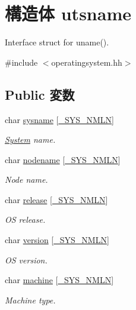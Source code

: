 \hypertarget{structOperatingSystem_1_1utsname}{
\section{構造体 utsname}
\label{structOperatingSystem_1_1utsname}
}


Interface struct for uname().  


{\ttfamily \#include $<$operatingsystem.hh$>$}\subsection*{Public 変数}
\begin{DoxyCompactItemize}
\item 
char \hyperlink{structOperatingSystem_1_1utsname_a2deb62088193f0a1a1c7169961ef9417}{sysname} \mbox{[}\hyperlink{classOperatingSystem_a1a19d4c9718c9a4ad5fa2e48271fccc9}{\_\-SYS\_\-NMLN}\mbox{]}
\begin{DoxyCompactList}\small\item\em \hyperlink{classSystem}{System} name. \item\end{DoxyCompactList}\item 
char \hyperlink{structOperatingSystem_1_1utsname_a3e8872e682806e061de2b1ee07bc75f3}{nodename} \mbox{[}\hyperlink{classOperatingSystem_a1a19d4c9718c9a4ad5fa2e48271fccc9}{\_\-SYS\_\-NMLN}\mbox{]}
\begin{DoxyCompactList}\small\item\em Node name. \item\end{DoxyCompactList}\item 
char \hyperlink{structOperatingSystem_1_1utsname_a4015ecb9ca3fd601ff8b8961eda3e7e2}{release} \mbox{[}\hyperlink{classOperatingSystem_a1a19d4c9718c9a4ad5fa2e48271fccc9}{\_\-SYS\_\-NMLN}\mbox{]}
\begin{DoxyCompactList}\small\item\em OS release. \item\end{DoxyCompactList}\item 
char \hyperlink{structOperatingSystem_1_1utsname_a1e88526d3e96aa25d88df1541dafe922}{version} \mbox{[}\hyperlink{classOperatingSystem_a1a19d4c9718c9a4ad5fa2e48271fccc9}{\_\-SYS\_\-NMLN}\mbox{]}
\begin{DoxyCompactList}\small\item\em OS version. \item\end{DoxyCompactList}\item 
char \hyperlink{structOperatingSystem_1_1utsname_a0687759450f1b8396e8e9415abe4b867}{machine} \mbox{[}\hyperlink{classOperatingSystem_a1a19d4c9718c9a4ad5fa2e48271fccc9}{\_\-SYS\_\-NMLN}\mbox{]}
\begin{DoxyCompactList}\small\item\em Machine type. \item\end{DoxyCompactList}\end{DoxyCompactItemize}


